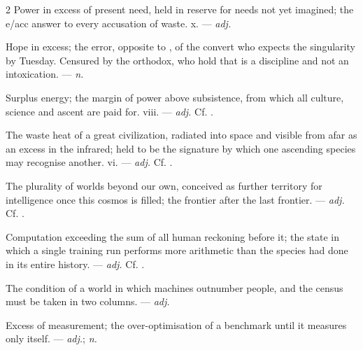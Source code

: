 \begin{multicols}{2}
 Power in excess of present need, held in reserve for needs not yet imagined; the e/acc answer to every accusation of waste.   x. —  \textit{adj.}

 Hope in excess; the error, opposite to , of the convert who expects the singularity by Tuesday. Censured by the orthodox, who hold that  is a discipline and not an intoxication. —  \textit{n.}

 Surplus energy; the margin of power above subsistence, from which all culture, science and ascent are paid for.   viii. —  \textit{adj.} Cf. .

 The waste heat of a great civilization, radiated into space and visible from afar as an excess in the infrared; held to be the signature by which one ascending species may recognise another.   vi. —  \textit{adj.} Cf. .

 The plurality of worlds beyond our own, conceived as further territory for intelligence once this cosmos is filled; the frontier after the last frontier. —  \textit{adj.} Cf. .

 Computation exceeding the sum of all human reckoning before it; the state in which a single training run performs more arithmetic than the species had done in its entire history. —  \textit{adj.} Cf. .

 The condition of a world in which machines outnumber people, and the census must be taken in two columns.   —  \textit{adj.}

 Excess of measurement; the over-optimisation of a benchmark until it measures only itself.  —  \textit{adj.};  \textit{n.}


\end{multicols}
